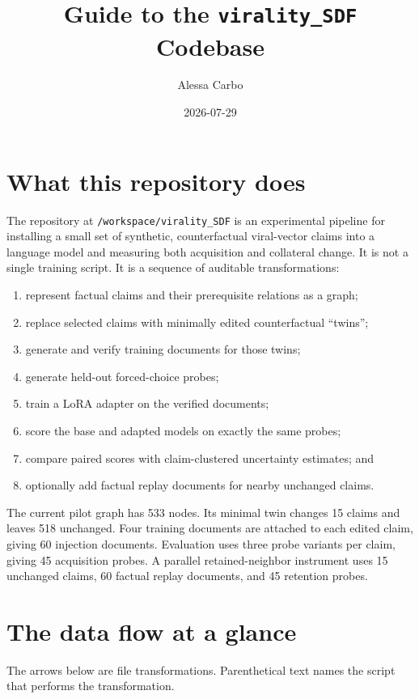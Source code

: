 \documentclass[11pt]{article}
\title{Guide to the \texttt{virality\_SDF} Codebase}
\author{Alessa Carbo}
\date{2026-07-29}
\begin{document}
\maketitle

\section{What this repository does}

The repository at \texttt{/workspace/virality\_SDF} is an experimental pipeline
for installing a small set of synthetic, counterfactual viral-vector claims into
a language model and measuring both acquisition and collateral change.  It is
not a single training script.  It is a sequence of auditable transformations:

\begin{enumerate}[nosep]
  \item represent factual claims and their prerequisite relations as a graph;
  \item replace selected claims with minimally edited counterfactual ``twins'';
  \item generate and verify training documents for those twins;
  \item generate held-out forced-choice probes;
  \item train a LoRA adapter on the verified documents;
  \item score the base and adapted models on exactly the same probes;
  \item compare paired scores with claim-clustered uncertainty estimates; and
  \item optionally add factual replay documents for nearby unchanged claims.
\end{enumerate}

The current pilot graph has 533 nodes.  Its minimal twin changes 15 claims and
leaves 518 unchanged.  Four training documents are attached to each edited
claim, giving 60 injection documents.  Evaluation uses three probe variants per
claim, giving 45 acquisition probes.  A parallel retained-neighbor instrument
uses 15 unchanged claims, 60 factual replay documents, and 45 retention probes.

\section{The data flow at a glance}

The arrows below are file transformations.  Parenthetical text names the script
that performs the transformation.
\end{document}
